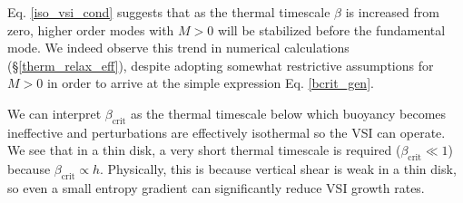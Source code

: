 Eq. \ref{iso_vsi_cond} suggests that as the thermal timescale $\beta$
is increased from zero, higher order modes with $M>0$
will be stabilized before the fundamental mode. We indeed observe this
trend in numerical calculations (\S\ref{therm_relax_eff}), despite
adopting somewhat restrictive assumptions for $M>0$ in order to arrive
at the simple expression Eq. \ref{bcrit_gen}. 


We can interpret  $\beta_\mathrm{crit}$ as the thermal timescale below
which buoyancy becomes ineffective and perturbations are effectively
isothermal so the VSI can operate.  We see that in a thin disk, a very short thermal timescale
is required ($\beta_\mathrm{crit}\ll 1$) because
$\beta_\mathrm{crit}\propto h$. Physically, this is because
vertical shear is weak in a thin disk, so even a small entropy
gradient can significantly reduce VSI growth rates.  






